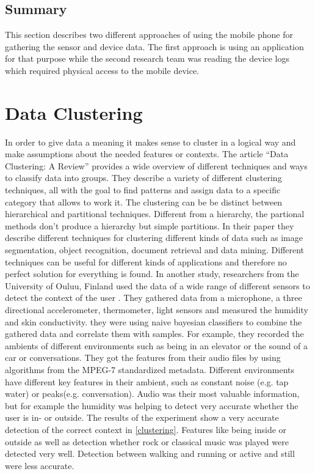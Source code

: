 \subsection{Summary} 
This section describes two different approaches of using the mobile phone for gathering the sensor and device data. The first approach is using an application for that purpose while the second research team was reading the device logs which required physical access to the mobile device.


\section{Data Clustering}
In order to give data a meaning it makes sense to cluster in a logical way and make assumptions about the needed features or contexts. 
The article ``Data Clustering: A Review'' \cite{jain1999data} provides a wide overview of different techniques and ways to classify data into groups. They describe a variety of different clustering techniques, all with the goal to find patterns and assign data to a specific category that allows to work it. The clustering can be be distinct between hierarchical and partitional techniques. Different from a hierarchy, the partional methods don't produce a hierarchy but simple partitions. In their paper they describe different techniques for clustering different kinds of data such as image segmentation, object recognition, document retrieval and data mining. Different techniques can be useful for different kinds of applications and therefore no perfect solution for everything is found. 
In another study, researchers from the University of Ouluu, Finland used the data of a wide range of different sensors to detect the context of the user \cite{korpipaa2003bayesian}. They gathered data from a microphone, a three directional accelerometer, thermometer, light sensors and measured the humidity and skin conductivity. 
they were using naive bayesian classifiers to combine the gathered data and correlate them with samples. For example, they recorded the ambients of different environments such as being in an elevator or the sound of a car or conversations. They got the features from their audio files by using algorithms from the MPEG-7 standardized metadata. Different environments have different key features in their ambient, such as constant noise (e.g. tap water) or peaks(e.g. conversation).
Audio was their most valuable information, but for example the humidity was helping to detect very accurate whether the user is in- or outside.
The results of the experiment show a very accurate detection of the correct context in \ref{clustering}. Features like being inside or outside as well as detection whether rock or classical music was played were detected very well. Detection between walking and running or active and still were less accurate.
